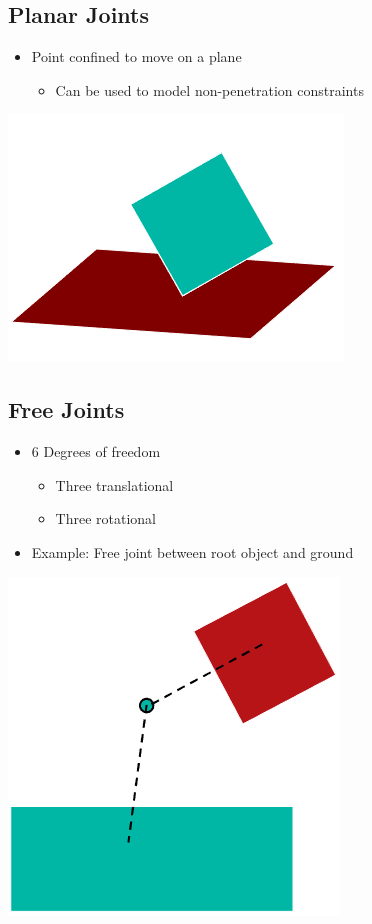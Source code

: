\documentclass{article}
\begin{document}
\subsection*{Planar Joints}
\begin{itemize}
    \item Point confined to move on a plane
    \begin{itemize}
        \item Can be used to model non-penetration constraints
    \end{itemize}
\end{itemize}
\begin{center}
    \includegraphics*[scale=0.8]{W7_7.png}
\end{center}

\subsection*{Free Joints}
\begin{itemize}
    \item 6 Degrees of freedom
    \begin{itemize}
        \item Three translational
        \item Three rotational
    \end{itemize}
    \item Example: Free joint between root object and ground
\end{itemize}
\begin{center}
    \includegraphics*[scale=0.8]{W7_8.png}
\end{center}
\end{document}

